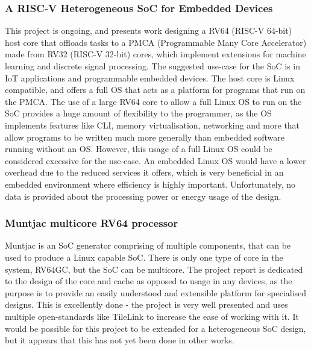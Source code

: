 \subsubsection{A RISC-V Heterogeneous SoC for Embedded Devices\cite{valenterisc}}
This project is ongoing, and presents work designing a RV64 (RISC-V 64-bit) host core that offloads tasks to a PMCA (Programmable Many Core Accelerator) made from RV32 (RISC-V 32-bit) cores, which implement extensions for machine learning and discrete signal processing. The suggested use-case for the SoC is in IoT applications and programmable embedded devices. The host core is Linux compatible, and offers a full OS that acts as a platform for programs that run on the PMCA. The use of a large RV64 core to allow a full Linux OS to run on the SoC provides a huge amount of flexibility to the programmer, as the OS implements features like CLI, memory virtualisation, networking and more that allow programs to be written much more generally than embedded software running without an OS. However, this usage of a full Linux OS could be considered excessive for the use-case. An embedded Linux OS would have a lower overhead due to the reduced services it offers, which is very beneficial in an embedded environment where efficiency is highly important. Unfortunately, no data is provided about the processing power or energy usage of the design.

\subsubsection{Muntjac multicore RV64 processor\cite{UCAM-CL-TR-972}}
Muntjac is an SoC generator comprising of multiple components, that can be used to produce a Linux capable SoC. There is only one type of core in the system, RV64GC\cite{}, but the SoC can be multicore. The project report is dedicated to the design of the core and cache as opposed to usage in any devices, as the purpose is to provide an easily understood and extensible platform for specialised designs. This is excellently done - the project is very well presented and uses multiple open-standards like TileLink\cite{} to increase the ease of working with it. It would be possible for this project to be extended for a heterogeneous SoC design, but it appears that this has not yet been done in other works.


